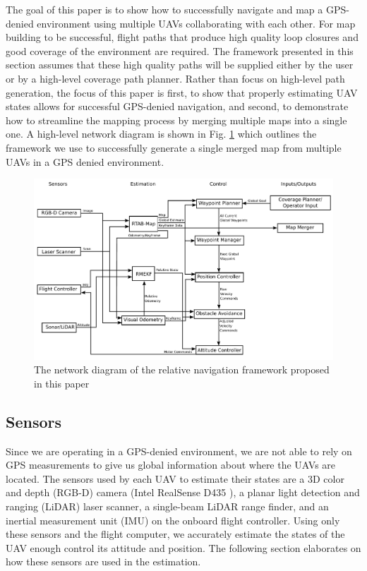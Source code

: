 \documentclass[letterpaper, 10 pt, conference]{ieeeconf}  %
\begin{document}
The goal of this paper is to show how to successfully navigate and map a GPS-denied environment using multiple UAVs collaborating with each other. For map building to be successful, flight paths that produce high quality loop closures and good coverage of the environment are required. The framework presented in this section assumes that these high quality paths will be supplied either by the user or by a high-level coverage path planner. Rather than focus on high-level path generation, the focus of this paper is first, to show that properly estimating UAV states allows for successful GPS-denied navigation, and second, to demonstrate how to streamline the mapping process by merging multiple maps into a single one. A high-level network diagram is shown in Fig. \ref{fig:rtab_network} which outlines the framework we use to successfully generate a single merged map from multiple UAVs in a GPS denied environment.

\begin{figure}
\centering
\includegraphics[width=1.0\linewidth]{rtab_relative_nav_network}
\caption{The network diagram of the relative navigation framework proposed in this paper}
\label{fig:rtab_network}
\end{figure}

\subsection{Sensors}

Since we are operating in a GPS-denied environment, we are not able to rely on GPS measurements to give us global information about where the UAVs are located. The sensors used by each UAV to estimate their states are a 3D color and depth (RGB-D) camera (Intel RealSense D435 \cite{Intel}), a planar light detection and ranging (LiDAR) laser scanner, a single-beam LiDAR range finder, and an inertial measurement unit (IMU) on the onboard flight controller. Using only these sensors and the flight computer, we accurately estimate the states of the UAV enough control its attitude and position. The following section elaborates on how these sensors are used in the estimation.
\end{document}
